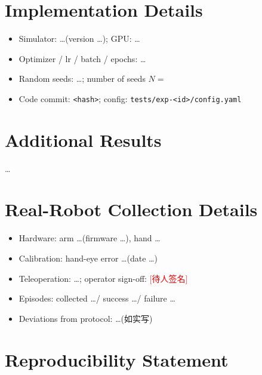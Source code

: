 
\section{Implementation Details}
\label{app:impl}
\begin{itemize}
  \item Simulator: \ldots (version \ldots); GPU: \ldots
  \item Optimizer / lr / batch / epochs: \ldots
  \item Random seeds: \ldots; number of seeds $N=$ \audittodo{}
  \item Code commit: \texttt{<hash>}; config: \texttt{tests/exp-<id>/config.yaml}
\end{itemize}

\section{Additional Results}
\label{app:more}
\ldots

\section{Real-Robot Collection Details}
\label{app:real}
\begin{itemize}
  \item Hardware: arm \ldots (firmware \ldots), hand \ldots
  \item Calibration: hand-eye error \ldots (date \ldots)
  \item Teleoperation: \ldots; operator sign-off: \textcolor{red}{[待人签名]}
  \item Episodes: collected \ldots / success \ldots / failure \ldots
  \item Deviations from protocol: \ldots (如实写)
\end{itemize}

\section*{Reproducibility Statement}

